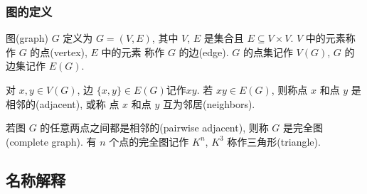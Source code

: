 \subsubsection{图的定义}
图(graph) $ G $ 定义为 $ G=(V, E) $, 其中 $ V $, $ E $ 是集合且
$ E \subseteq V\times V $. $ V $ 中的元素称作 $ G $ 的点(vertex), $ E $ 中的元素
称作 $ G $ 的边(edge). $ G $ 的点集记作 $ V(G) $, $ G $ 的边集记作 $ E(G) $.

对 $ x, y\in V(G) $, 边 $ \{x, y\} \in E(G) $记作$ xy $.
若 $ xy \in E(G) $, 则称点 $ x $ 和点 $ y $ 是相邻的(adjacent), 或称
点 $ x $ 和点 $ y $ 互为邻居(neighbors).

若图 $ G $ 的任意两点之间都是相邻的(pairwise adjacent), 则称 $ G $
是完全图(complete graph). 有 $ n $ 个点的完全图记作 $ K^{n} $, $ K^{3} $
称作三角形(triangle).

\subsection{名称解释}

